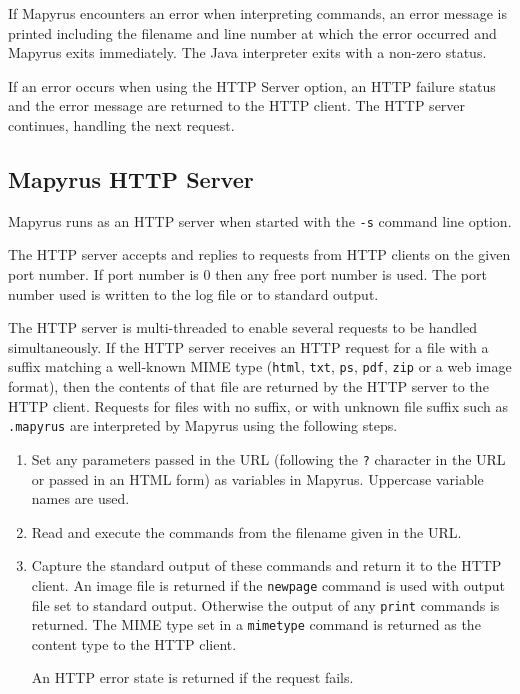 If Mapyrus encounters an error when interpreting commands,
an error message is printed including the filename and line number
at which the error occurred and Mapyrus exits immediately.
The Java interpreter exits with a non-zero status.

If an error occurs when using the HTTP Server
option, an HTTP failure status and the error message
are returned to the HTTP client.  The HTTP server continues,
handling the next request.

\subsection{Mapyrus HTTP Server}

Mapyrus runs as an HTTP server when started with the \texttt{-s} command line
option.

The HTTP server accepts and replies to requests from HTTP clients on the given
port number.  If port number is 0 then any free port number is used.  The port
number used is written to the log file or to standard output.

The HTTP server is multi-threaded to enable several requests to be handled
simultaneously.  If the HTTP server receives an HTTP request for a file with a
suffix matching a well-known MIME type (\texttt{html}, \texttt{txt},
\texttt{ps}, \texttt{pdf}, \texttt{zip} or a web image format), then the
contents of that file are returned by the HTTP server to the HTTP client.
Requests for files with no suffix, or with unknown file suffix
such as \texttt{.mapyrus} are interpreted
by Mapyrus using the following steps.

\begin{enumerate}
\item
Set any parameters passed in the URL (following the \texttt{?} character in
the URL or passed in an HTML form) as variables in Mapyrus.
Uppercase variable names are used.
\item
Read and execute the commands from the filename given in the URL.
\item
Capture the standard output of these commands and return it to the
HTTP client.
An image file is returned if the
\texttt{newpage} command is used with output file set
to standard output.
Otherwise the output of any \texttt{print} commands is returned.
The MIME type set in a \texttt{mimetype} command is returned as
the content type to the HTTP client.

An HTTP error state is returned if the request fails.
\end{enumerate}

